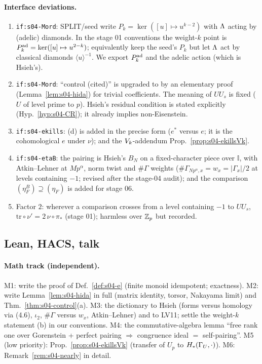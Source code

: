 \paragraph{Interface deviations.}
\begin{enumerate}[label=(D\arabic*)]
\item \texttt{if:s04-Mord}: SPLIT/seed write $P_k=\ker([u]\mapsto u^{k-2})$ with $\Lambda$ acting by (adelic) diamonds. In the stage 01
  conventions the weight-$k$ point is $P^{\rm ad}_k=\ker([u]\mapsto u^{2-k})$; equivalently keep the seed's $P_k$ but let $\Lambda$ act by
  classical diamonds $\langle u\rangle^{-1}$. We export $P^{\rm ad}_k$ and the adelic action (which is Hsieh's).
\item \texttt{if:s04-Mord}: ``control (cited)'' is upgraded to \stpmc{} by an elementary proof (Lemma~\ref{lem:s04-hida}) for trivial
  coefficients. The meaning of $UU_s$ is fixed ($U$ of level prime to $p$). Hsieh's residual condition is stated explicitly
  (Hyp.~\ref{hyp:s04-CR}); it already implies non-Eisenstein.
\item \texttt{if:s04-ekills}: (d) is added in the precise form ($e^*$ versus $e$; it is the cohomological $e$ under $\nu$); and the
  $V_k$-addendum Prop.~\ref{prop:s04-ekillsVk}.
\item \texttt{if:s04-etaB}: the pairing is Hsieh's $B_N$ on a fixed-character piece over $\mathbb I$, with Atkin--Lehner at $Mp^\alpha$,
  norm twist and $\#\Gamma$ weights ($\#\Gamma_{Np^\alpha,x}=w_x=|\Gamma_x|/2$ at levels containing $-1$; revised after the stage-04 audit); and the comparison $(\eta^B_F)\supseteq(\eta_F)$ is
  added for stage 06.
\item Factor $2$: wherever a comparison crosses from a level containing $-1$ to $UU_s$, $\mathrm{tr}\circ\nu'=2\,\nu\circ\pi_*$ (stage 01);
  harmless over $\mathbb{Z}_p$ but recorded.
\end{enumerate}

\subsection{Lean, HACS, talk}
\paragraph{Math track (independent).}
M1: write the proof of Def.~\ref{def:s04-e} (finite monoid idempotent; exactness). M2: write Lemma~\ref{lem:s04-hida} in full
(matrix identity, torsor, Nakayama limit) and Thm.~\ref{thm:s04-control}(a). M3: the dictionary to Hsieh (forms versus homology via
(4.6), $\iota_2$, $\#\Gamma$ versus $w_x$, Atkin--Lehner) and to LV11; settle the weight-$k$ statement (b) in our conventions.
M4: the commutative-algebra lemma ``free rank one over Gorenstein + perfect pairing $\Rightarrow$ congruence ideal $=$ self-pairing''.
M5 (low priority): Prop.~\ref{prop:s04-ekillsVk} (transfer of $U_p$ to $H_*(\Gamma_U,\cdot)$). M6: Remark~\ref{rem:s04-nearly} in detail.

